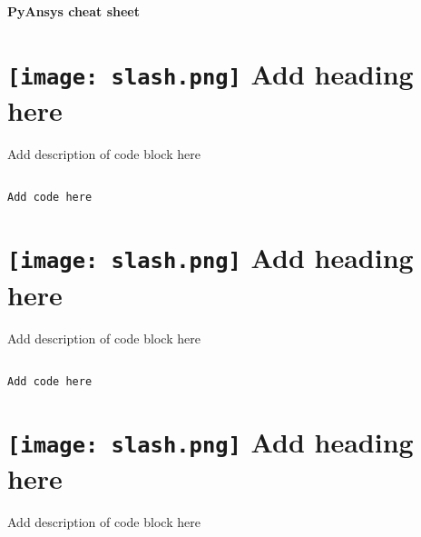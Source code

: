 \documentclass[9pt,landscape]{article}
\begin{document}
\raggedright
\footnotesize


\begin{center}
     \Huge{\textbf{PyAnsys cheat sheet}} \\
\end{center}
\vspace{-0.15cm}
\noindent\makebox[\linewidth]{\rule{\paperwidth}{2pt}}

\begin{multicols}{3}
\setlength{\premulticols}{1pt}
\setlength{\postmulticols}{1pt}
\setlength{\multicolsep}{1pt}
\setlength{\columnsep}{2pt}


\section{\texttt{[image: slash.png]} Add heading here}
Add description of code block here
\begin{lstlisting}[language=Python]

Add code here

\end{lstlisting}


\vfill
\section{\texttt{[image: slash.png]}  Add heading here}
Add description of code block here
\begin{lstlisting}[language=Python]

Add code here

\end{lstlisting} 

\vfill
\section{\texttt{[image: slash.png]}  Add heading here}
Add description of code block here
\begin{lstlisting}[language=Python]


\end{lstlisting}
\end{multicols}
\end{document}
